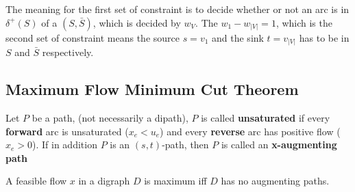             The meaning for the first set of constraint is to decide whether or not an arc is in $\delta^+(S)$ of a $(S, \bar{S})$, which is decided by $w_V$. The $w_1 - w_{|V|} = 1$, which is the second set of constraint means the source $s = v_1$ and the sink $t = v_{|V|}$ has to be in $S$ and $\bar{S}$ respectively.

        \subsection{Maximum Flow Minimum Cut Theorem}
            \begin{definition}
                Let $P$ be a path, (not necessarily a dipath), $P$ is called \textbf{unsaturated} if every \textbf{forward} arc is unsaturated ($x_e < u_e$) and every \textbf{reverse} arc has positive flow ($x_e > 0$). If in addition $P$ is an $(s, t)$-path, then $P$ is called an \textbf{x-augmenting path}
            \end{definition}

            \begin{theorem}
                A feasible flow $x$ in a digraph $D$ is maximum iff $D$ has no augmenting paths.
            \end{theorem}

